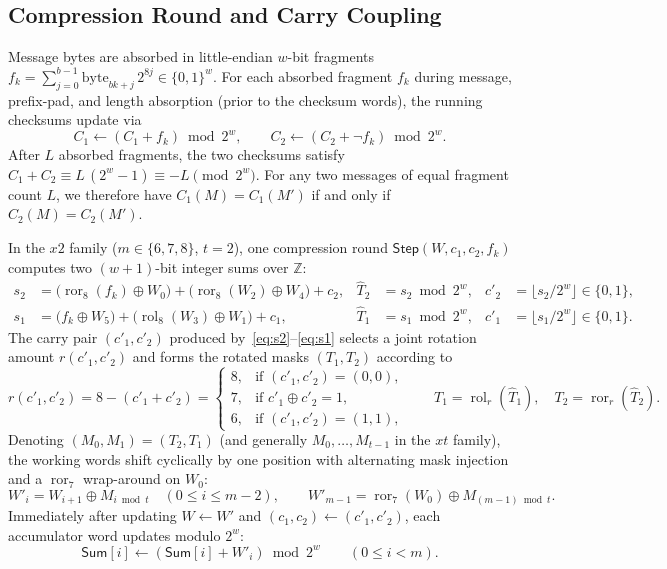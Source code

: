 \documentclass[11pt,a4paper]{article}
\theoremstyle{definition}
\theoremstyle{remark}
\newcommand{\ror}{\operatorname{ror}}
\newcommand{\rol}{\operatorname{rol}}
\newcommand{\SumAcc}{\mathsf{Sum}}
\begin{document}
\subsection{Compression Round and Carry Coupling}
\label{subsec:spec-round}
Message bytes are absorbed in little-endian $w$-bit fragments $f_k = \sum_{j=0}^{b-1} \mathrm{byte}_{bk+j}\,2^{8j} \in \{0,1\}^w$. For each absorbed fragment $f_k$ during message, prefix-pad, and length absorption (prior to the checksum words), the running checksums update via
\begin{equation}
    C_1 \leftarrow (C_1 + f_k) \bmod 2^w, \qquad C_2 \leftarrow (C_2 + \neg f_k) \bmod 2^w.
    \label{eq:checksums}
\end{equation}
After $L$ absorbed fragments, the two checksums satisfy $C_1 + C_2 \equiv L\,(2^w - 1) \equiv -L \pmod{2^w}$. For any two messages of equal fragment count $L$, we therefore have $C_1(M) = C_1(M')$ if and only if $C_2(M) = C_2(M')$.

In the $x2$ family ($m \in \{6,7,8\}$, $t = 2$), one compression round $\mathsf{Step}(W, c_1, c_2, f_k)$ computes two $(w+1)$-bit integer sums over $\mathbb{Z}$:
\begin{align}
    s_2 &= \bigl(\ror_8(f_k) \oplus W_0\bigr) + \bigl(\ror_8(W_2) \oplus W_4\bigr) + c_2,
    & \hat{T}_2 &= s_2 \bmod 2^w, & c'_2 &= \lfloor s_2 / 2^w \rfloor \in \{0,1\}, \label{eq:s2}\\
    s_1 &= \bigl(f_k \oplus W_5\bigr) + \bigl(\rol_8(W_3) \oplus W_1\bigr) + c_1,
    & \hat{T}_1 &= s_1 \bmod 2^w, & c'_1 &= \lfloor s_1 / 2^w \rfloor \in \{0,1\}. \label{eq:s1}
\end{align}
The carry pair $(c'_1, c'_2)$ produced by~\eqref{eq:s2}--\eqref{eq:s1} selects a joint rotation amount $r(c'_1, c'_2)$ and forms the rotated masks $(T_1, T_2)$ according to
\[
    r(c'_1, c'_2) = 8 - (c'_1 + c'_2) =
    \begin{cases}
        8, & \text{if } (c'_1, c'_2) = (0, 0),\\
        7, & \text{if } c'_1 \oplus c'_2 = 1,\\
        6, & \text{if } (c'_1, c'_2) = (1, 1),
    \end{cases}
    \qquad
    T_1 = \rol_r(\hat{T}_1), \quad T_2 = \ror_r(\hat{T}_2).
\]
Denoting $(M_0, M_1) = (T_2, T_1)$ (and generally $M_0, \dots, M_{t-1}$ in the $xt$ family), the working words shift cyclically by one position with alternating mask injection and a $\ror_7$ wrap-around on $W_0$:
\begin{equation}
    W'_i = W_{i+1} \oplus M_{i \bmod t} \quad (0 \le i \le m - 2),
    \qquad
    W'_{m-1} = \ror_7(W_0) \oplus M_{(m-1) \bmod t}.
    \label{eq:word-shift}
\end{equation}
Immediately after updating $W \leftarrow W'$ and $(c_1, c_2) \leftarrow (c'_1, c'_2)$, each accumulator word updates modulo $2^w$:
\[
    \SumAcc[i] \leftarrow (\SumAcc[i] + W'_i) \bmod 2^w \qquad (0 \le i < m).
\]
\end{document}
